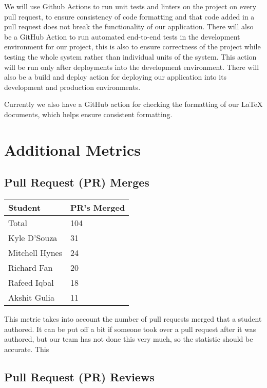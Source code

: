 \documentclass{article}
\begin{document}
We will use Github Actions to run unit tests and linters on the
project on every pull request, to ensure consistency of code
formatting and that code added in a pull request does not break the
functionality of our application. There will also be a GitHub Action
to run automated end-to-end tests in the development environment for
our project, this is also to ensure correctness of the project while
testing the whole system rather than individual units of the system.
This action will be run only after deployments into the development
environment. There will also be a build and deploy action for
deploying our application into its development and production environments.

Currently we also have a GitHub action for checking the formatting of
our LaTeX documents, which helps ensure consistent formatting.

\section{Additional Metrics}

\subsection{Pull Request (PR) Merges}

\begin{table}[H]
  \centering
  \begin{tabular}{ll}
    \toprule
    \textbf{Student} & \textbf{PR's Merged}\\
    \midrule
    Total & 104\\
    Kyle D'Souza & 31\\
    Mitchell Hynes & 24\\
    Richard Fan & 20\\
    Rafeed Iqbal & 18\\
    Akshit Gulia & 11\\
    \bottomrule
  \end{tabular}
\end{table}

This metric takes into account the number of pull requests merged that a student authored. It can be put off a bit if someone took over a pull request after it was authored, but our team has not done this very much, so the statistic should be accurate. This 

\subsection{Pull Request (PR) Reviews}
\end{document}
